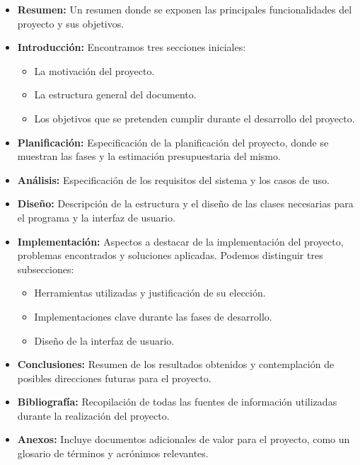 \begin{itemize}
	\item \textbf{Resumen:} Un resumen donde se exponen las principales funcionalidades del proyecto y sus objetivos. 
	
	\item \textbf{Introducción:} Encontramos tres secciones iniciales: 
	\begin{itemize}
		\item La motivación del proyecto.
		\item La estructura general del documento.
		\item Los objetivos que se pretenden cumplir durante el desarrollo del proyecto.
	\end{itemize}
	
	\item \textbf{Planificación:} Especificación de la planificación del proyecto, donde se muestran las fases y la estimación presupuestaria del mismo. 
	
	\item \textbf{Análisis:} Especificación de los requisitos del sistema y los casos de uso. 
	
	\item \textbf{Diseño:} Descripción de la estructura y el diseño de las clases necesarias para el programa y la interfaz de usuario.
	
	\item \textbf{Implementación:} Aspectos a destacar de la implementación del proyecto, problemas encontrados y soluciones aplicadas. Podemos distinguir tres subsecciones: 
	\begin{itemize}
		\item Herramientas utilizadas y justificación de su elección.
		\item Implementaciones clave durante las fases de desarrollo.
		\item Diseño de la interfaz de usuario.
	\end{itemize}
	
	\item \textbf{Conclusiones:} Resumen de los resultados obtenidos y contemplación de posibles direcciones futuras para el proyecto.
	
	\item \textbf{Bibliografía:} Recopilación de todas las fuentes de información utilizadas durante la realización del proyecto.
	
	\item \textbf{Anexos:} Incluye documentos adicionales de valor para el proyecto, como un glosario de términos y acrónimos relevantes.
\end{itemize}
\newpage

